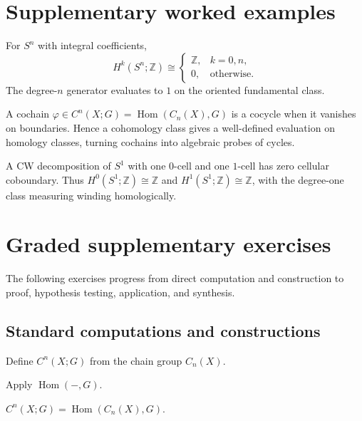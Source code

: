 \section{Supplementary worked examples}
\label{sec:viii28-pedagogy}

\begin{example}\label{ex:viii28-ped-01}
For $S^n$ with integral coefficients,
\[
H^k(S^n;\mathbb Z)\cong
\begin{cases}
\mathbb Z,&k=0,n,\\
0,&\text{otherwise}.
\end{cases}
\]
The degree-$n$ generator evaluates to $1$ on the oriented fundamental class.
\end{example}

\begin{example}\label{ex:viii28-ped-02}
A cochain $\varphi\in C^n(X;G)=\operatorname{Hom}(C_n(X),G)$ is a cocycle when it vanishes on boundaries. Hence a cohomology class gives a well-defined evaluation on homology classes, turning cochains into algebraic probes of cycles.
\end{example}

\begin{example}\label{ex:viii28-ped-03}
A CW decomposition of $S^1$ with one $0$-cell and one $1$-cell has zero cellular coboundary. Thus $H^0(S^1;\mathbb Z)\cong\mathbb Z$ and $H^1(S^1;\mathbb Z)\cong\mathbb Z$, with the degree-one class measuring winding homologically.
\end{example}

\section{Graded supplementary exercises}
The following exercises progress from direct computation and construction to proof, hypothesis testing, application, and synthesis.

\subsection*{Standard computations and constructions}

\begin{exercise}\label{exr:viii28-ped-01}
Define $C^n(X;G)$ from the chain group $C_n(X)$.
\end{exercise}
\begin{hint}
Apply $\operatorname{Hom}(-,G)$.
\end{hint}
\begin{solution}
$C^n(X;G)=\operatorname{Hom}(C_n(X),G)$.
\end{solution}

